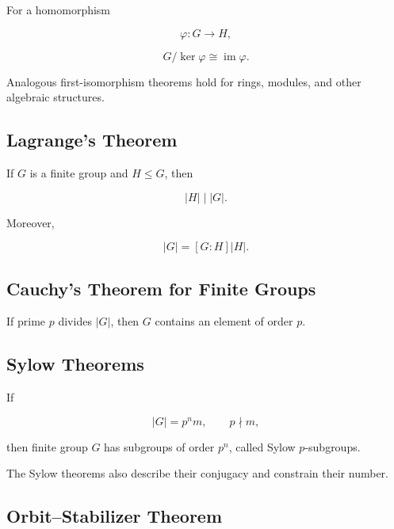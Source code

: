 For a homomorphism

\[
\varphi:G\to H,
\]

\[
\boxed{
G/\ker\varphi
\cong
\operatorname{im}\varphi.
}
\]

Analogous first-isomorphism theorems hold for rings, modules, and other
algebraic structures.

\subsection{Lagrange's Theorem}
\label{subsec:lagranges-theorem-group-summary}

If \(G\) is a finite group and \(H\leq G\), then

\[
\boxed{
|H|
\mid
|G|.
}
\]

Moreover,

\[
\boxed{
|G|
=
[G:H]|H|.
}
\]

\subsection{Cauchy's Theorem for Finite Groups}
\label{subsec:cauchy-group-summary}

If prime \(p\) divides \(|G|\), then \(G\) contains an element of order \(p\).

\subsection{Sylow Theorems}
\label{subsec:sylow-summary}

If

\[
|G|
=
p^nm,
\qquad
p\nmid m,
\]

then finite group \(G\) has subgroups of order \(p^n\), called Sylow
\(p\)-subgroups.

The Sylow theorems also describe their conjugacy and constrain their number.

\subsection{Orbit--Stabilizer Theorem}
\label{subsec:orbit-stabilizer-summary}

